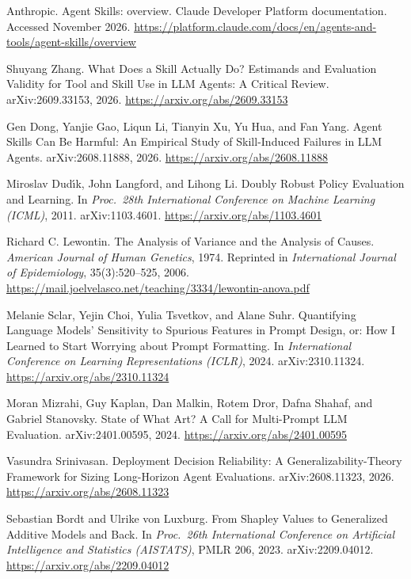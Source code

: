 Anthropic.
\newblock Agent Skills: overview. Claude Developer Platform documentation.
\newblock Accessed November 2026.
\newblock \url{https://platform.claude.com/docs/en/agents-and-tools/agent-skills/overview}

Shuyang Zhang.
\newblock What Does a Skill Actually Do? Estimands and Evaluation Validity for Tool and Skill Use in LLM Agents: A Critical Review.
\newblock arXiv:2609.33153, 2026.
\newblock \url{https://arxiv.org/abs/2609.33153}

Gen Dong, Yanjie Gao, Liqun Li, Tianyin Xu, Yu Hua, and Fan Yang.
\newblock Agent Skills Can Be Harmful: An Empirical Study of Skill-Induced Failures in LLM Agents.
\newblock arXiv:2608.11888, 2026.
\newblock \url{https://arxiv.org/abs/2608.11888}

Miroslav Dud\'{\i}k, John Langford, and Lihong Li.
\newblock Doubly Robust Policy Evaluation and Learning.
\newblock In \textit{Proc.\ 28th International Conference on Machine Learning (ICML)}, 2011. arXiv:1103.4601.
\newblock \url{https://arxiv.org/abs/1103.4601}

Richard C. Lewontin.
\newblock The Analysis of Variance and the Analysis of Causes.
\newblock \textit{American Journal of Human Genetics}, 1974. Reprinted in \textit{International Journal of Epidemiology}, 35(3):520--525, 2006.
\newblock \url{https://mail.joelvelasco.net/teaching/3334/lewontin-anova.pdf}

Melanie Sclar, Yejin Choi, Yulia Tsvetkov, and Alane Suhr.
\newblock Quantifying Language Models' Sensitivity to Spurious Features in Prompt Design, or: How I Learned to Start Worrying about Prompt Formatting.
\newblock In \textit{International Conference on Learning Representations (ICLR)}, 2024. arXiv:2310.11324.
\newblock \url{https://arxiv.org/abs/2310.11324}

Moran Mizrahi, Guy Kaplan, Dan Malkin, Rotem Dror, Dafna Shahaf, and Gabriel Stanovsky.
\newblock State of What Art? A Call for Multi-Prompt LLM Evaluation.
\newblock arXiv:2401.00595, 2024.
\newblock \url{https://arxiv.org/abs/2401.00595}

Vasundra Srinivasan.
\newblock Deployment Decision Reliability: A Generalizability-Theory Framework for Sizing Long-Horizon Agent Evaluations.
\newblock arXiv:2608.11323, 2026.
\newblock \url{https://arxiv.org/abs/2608.11323}

Sebastian Bordt and Ulrike von Luxburg.
\newblock From Shapley Values to Generalized Additive Models and Back.
\newblock In \textit{Proc.\ 26th International Conference on Artificial Intelligence and Statistics (AISTATS)}, PMLR 206, 2023. arXiv:2209.04012.
\newblock \url{https://arxiv.org/abs/2209.04012}

